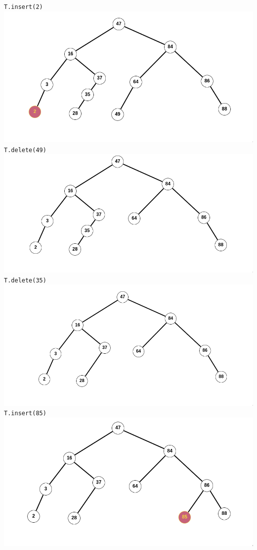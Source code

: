 \documentclass[12pt,twoside]{article}
\begin{document}
\begin{problems}
\begin{problemparts}
{\tt T.insert(2)} \\
\includegraphics[width=1.0\textwidth]{./trees/img1.png}
{\tt T.delete(49)} \\
\includegraphics[width=1.0\textwidth]{./trees/img2.png}
{\tt T.delete(35)}\\
\includegraphics[width=1.0\textwidth]{./trees/img3.png}
{\tt T.insert(85)}\\
\includegraphics[width=1.0\textwidth]{./trees/img4.png}

\end{problemparts}
\end{problems}
\end{document}

